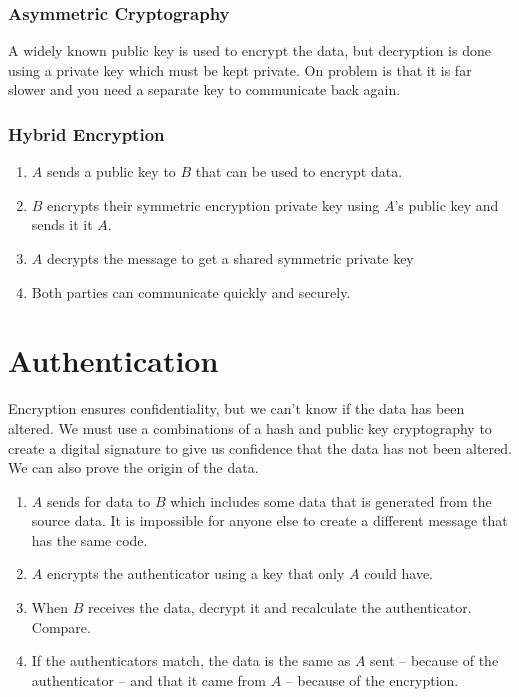 \subsubsection{Asymmetric Cryptography}\label{ssub:asymmetric_cryptography}

A widely known public key is used to encrypt the data, but decryption is done using a private key which must be kept private.
On problem is that it is far slower and you need a separate key to communicate back again.

\subsubsection{Hybrid Encryption}\label{ssub:hybrid_encryption}

\begin{enumerate}
    \item \(A\) sends a public key to \(B\) that can be used to encrypt data.
    \item \(B\) encrypts their symmetric encryption private key using \(A\)'s public key and sends it it \(A\).
    \item \(A\) decrypts the message to get a shared symmetric private key
    \item Both parties can communicate quickly and securely.
\end{enumerate}

\section{Authentication}\label{sec:authentication}

Encryption ensures confidentiality, but we can't know if the data has been altered.
We must use a combinations of a hash and public key cryptography to create a digital signature to give us confidence that the data has not been altered.
We can also prove the origin of the data.

\begin{enumerate}
    \item \(A\) sends for data to \(B\) which includes some data that is generated from the source data.
          It is impossible for anyone else to create a different message that has the same code.
    \item \(A\) encrypts the authenticator using a key that only \(A\) could have.
    \item When \(B\) receives the data, decrypt it and recalculate the authenticator.
          Compare.
    \item If the authenticators match, the data is the same as \(A\) sent -- because of the authenticator -- and that it came from \(A\) -- because of the encryption.
\end{enumerate}

